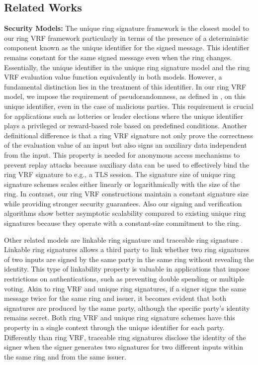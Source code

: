 \subsection{Related Works}


\noindent\textbf{Security Models:} The unique ring signature framework \cite{URCframework} is the closest model to our ring VRF framework particularly in terms of the presence of a deterministic component known as the unique identifier for the signed message. This identifier remains constant for the same signed message even when the ring changes.  Essentially, the unique identifier in the unique ring signature model and the ring VRF evaluation value function equivalently in both models. However, a fundamental distinction lies in the treatment of this identifier. In our ring VRF model, we impose the requirement of pseudorandomness, as defined in \cite{ucvrf,praos}, on this unique identifier, even in the case of malicious parties.
This requirement is crucial for applications such as lotteries or leader elections where the unique identifier plays a privileged or reward-based role based on predefined conditions. Another definitional difference is that a ring VRF  signature not only prove the correctness of the evaluation value of an input but also signs an auxiliary data independent from the input. This property is needed for anonymous access mechanisms to prevent replay attacks because auxiliary data can be used to effectively bind the ring VRF signature to e.g., a TLS session.
The signature size of unique ring signature schemes scales either linearly \cite{URCframework,URCfc} or logarithmically  \cite{URCblockchainprivacy,URClattice} with the size of the ring. In contrast, our ring VRF constructions maintain a constant signature size while providing stronger security guarantees. Also our signing and verification algorithms show better asymptotic scalability compared to existing unique ring signatures because they operate with a constant-size  commitment to the ring.

Other related models are linkable ring signature \cite{ring_linkable,ring_linkablee} and traceable ring signature \cite{traceable07,traceable_sub}. Linkable ring signatures allows a third party to link whether two ring signatures of two inputs are signed by the same party in the same ring without revealing the identity. This type of linkability property is valuable in applications that impose restrictions on authentications, such as preventing double spending or multiple voting. Akin to ring VRF and unique ring signatures, if a signer signs the same message twice for the same ring and issuer, it becomes evident that both signatures are produced by the same party, although the specific party's identity remains secret. Both ring VRF and unique ring signature schemes have this property in a single context through the unique identifier for each party.
Differently than ring VRF, traceable ring signatures  disclose the identity of the signer when the signer generates two signatures for two different inputs within the same ring and from the same issuer.

